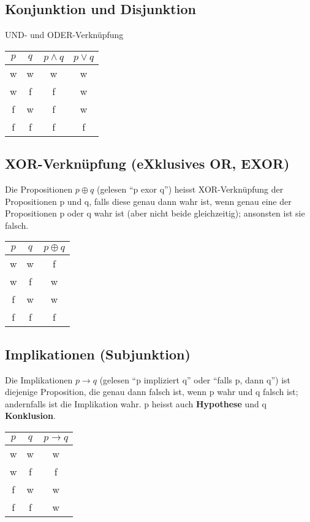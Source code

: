 \documentclass[12pt,a4paper]{article}
\begin{document}
\subsection{Konjunktion und Disjunktion}UND- und ODER-Verknüpfung\\
\begin{tabular}{|c|c|c|c|}
    \hline
        $p$&$q$&$p\wedge q$&$p\vee q$\\
        \hline
        w&w&w&w\\
        w&f&f&w\\
        f&w&f&w\\
        f&f&f&f\\
    \hline
\end{tabular}

\subsection{XOR-Verknüpfung (eXklusives OR, EXOR)}Die Propositionen $p \oplus q$ (gelesen "`p exor q"') heisst XOR-Verknüpfung der Propositionen p und q, falls diese genau dann wahr ist, wenn genau eine der Propositionen p oder q wahr ist (aber nicht beide gleichzeitig); ansonsten ist sie falsch.\\
\begin{tabular}{|c|c|c|}
    \hline
        $p$&$q$&$p\oplus q$\\
        \hline
        w&w&f\\
        w&f&w\\
        f&w&w\\
        f&f&f\\
    \hline
\end{tabular}

\subsection{Implikationen (Subjunktion)}Die Implikationen $p \rightarrow q$ (gelesen "`p impliziert q"' oder "`falls p, dann q"') ist diejenige Proposition, die genau dann falsch ist, wenn p wahr und q falsch ist; andernfalls ist die Implikation wahr. p heisst auch \textbf{Hypothese} und q \textbf{Konklusion}.\\
\begin{tabular}{|c|c|c|}
    \hline
        $p$&$q$&$p\rightarrow q$\\
        \hline
        w&w&w\\
        w&f&f\\
        f&w&w\\
        f&f&w\\
    \hline
\end{tabular}
\end{document}
